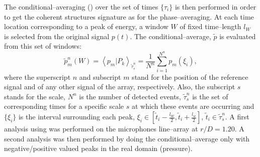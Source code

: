 The conditional--averaging () over the set of times $\{\tau_{i}\}$ is then performed in order to get the coherent structures signature as for the phase--averaging.
At each time location corresponding to a peak of energy, a window $W$ of fixed time--length $l_{W}$ is selected from the original signal $p \left( t \right)$. The conditional--average, $\tilde{p}$ is evaluated from this set of windows:
\begin{equation} \label{eqn:ensembleAverage}
	\tilde{p}^n_{m}\left( W \right) = \left< p_{m} | P_{k} \right>_{\tilde{\tau}^n_{s}} = \frac{1}{N^n} \sum^{N^n}_{i = 1} p_{m}\left(\xi_{i}\right),
\end{equation}
where the superscript $n$ and subscript $m$ stand for the position of the reference signal and of any other signal of the array, respectively.
Also, the subscript $s$ stands for the scale, $N^n$ is the number of detected events, $\tilde{\tau}^n_{s}$ is the set of corresponding times for a specific scale $s$ at which these events are occurring and $\{\xi_{i}\}$ is the interval surrounding each peak, $\xi_{i} \in \left[ \tilde{t}_{i} - \frac{l_W}{2}, \tilde{t}_{i} + \frac{l_w}{2} \right]$, $\tilde{t}_{i} \in \tilde{\tau}^n_{s}$.
A first analysis using  was performed on the microphones line--array at $r/D = 1.20$.
A second analysis was then performed by doing the conditional--average only with negative/positive valued peaks in the real domain (pressure).

